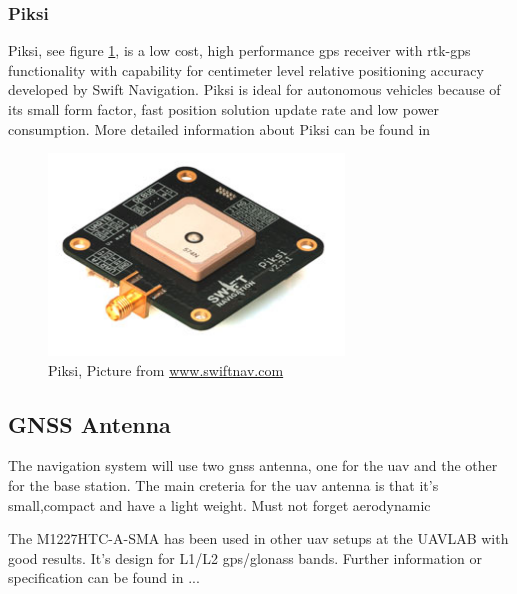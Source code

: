 \subsubsection{Piksi}\label{ss:Piksi}
Piksi, see figure \ref{figure:Piksi}, is a low cost, high performance \gls{gps} receiver with \gls{rtk-gps} functionality with capability for centimeter level relative positioning accuracy developed by Swift Navigation. Piksi is ideal for autonomous vehicles because of its small form factor, fast position solution update rate and low power consumption. 
More detailed information about Piksi can be found in \citep{Piksiv231}
\begin{figure}[H]
	\centering
		\includegraphics[width=0.7\textwidth]{figs/piksi_top.jpg}
		\caption{Piksi, Picture from \url{www.swiftnav.com}}
		\label{figure:Piksi}
\end{figure}
\subsection{GNSS Antenna}
The navigation system will use two \gls{gnss} antenna, one for the \gls{uav} and the other for the base station. The main creteria for the \gls{uav} antenna is that it's small,compact and have a light weight. Must not forget aerodynamic

The M1227HTC-A-SMA has been used in other \gls{uav} setups at the UAVLAB with good results. It's design for L1/L2 gps/glonass bands. Further information or specification can be found in ...


